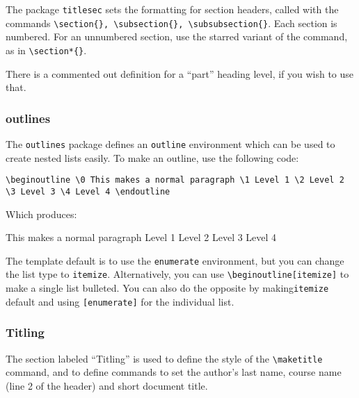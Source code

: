 \documentclass[12pt]{article}
\begin{document}
    The package \texttt{titlesec} sets the formatting for section headers, called with the commands \texttt{\textbackslash section\{\}, \textbackslash subsection\{\}, \textbackslash subsubsection\{\}}. Each section is numbered. For an unnumbered section, use the starred variant of the command, as in \texttt{\textbackslash section*\{\}}.

    There is a commented out definition for a ``part'' heading level, if you wish to use that. 


\subsubsection{outlines}

    The \texttt{outlines} package defines an \texttt{outline} environment which can be used to create nested lists easily. To make an outline, use the following code:

    \texttt{\textbackslash begin{outline}
                \textbackslash 0 This makes a normal paragraph
                    \textbackslash 1 Level 1
                        \textbackslash 2 Level 2
                            \textbackslash 3 Level 3
                                \textbackslash 4 Level 4
            \textbackslash end{outline}
    }

    Which produces: 

        \begin{outline}
            \0 This makes a normal paragraph
                \1 Level 1
                    \2 Level 2
                        \3 Level 3
                            \4 Level 4
        \end{outline}



    The template default is to use the \texttt{enumerate} environment, but you can change the list type to \texttt{itemize}. Alternatively, you can use \texttt{\textbackslash begin{outline}[itemize]} to make a single list bulleted. You can also do the opposite by making\texttt{itemize} default and using \texttt{[enumerate]} for the individual list.

\subsubsection{Titling}

    The section labeled ``Titling'' is used to define the style of the \texttt{\textbackslash maketitle} command, and to define commands to set the author's last name, course name (line 2 of the header) and short document title. 
\end{document}
